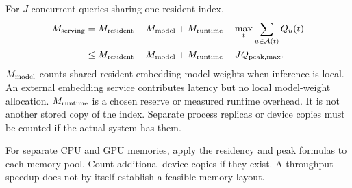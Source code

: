For $J$ concurrent queries sharing one resident index,
\begin{equation}
\begin{aligned}
M_{\rm serving}&=M_{\rm resident}+M_{\rm model}+M_{\rm runtime}
                 +\max_t\sum_{u\in\mathcal A(t)}Q_u(t)\\
&\leq M_{\rm resident}+M_{\rm model}+M_{\rm runtime}+JQ_{\rm peak,max}.
\end{aligned}
\label{eq:serving}
\end{equation}
$M_{\rm model}$ counts shared resident embedding-model weights when inference is local. An external embedding service contributes latency but no local model-weight allocation. $M_{\rm runtime}$ is a chosen reserve or measured runtime overhead. It is not another stored
copy of the index. Separate process replicas or device copies must be counted if the actual
system has them.

For separate CPU and GPU memories, apply the residency and peak formulas to each memory pool. Count additional device copies if they exist. A throughput speedup does not by itself establish a feasible memory layout.
